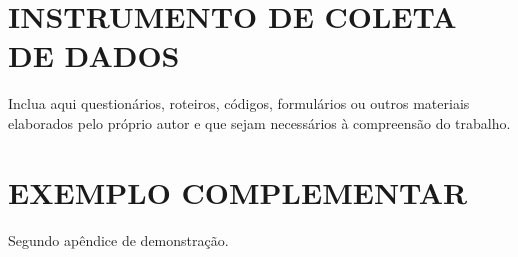 
\iniciarapendices

\chapter{INSTRUMENTO DE COLETA DE DADOS}

Inclua aqui questionários, roteiros, códigos, formulários ou outros materiais elaborados pelo próprio autor e que sejam necessários à compreensão do trabalho.

\chapter{EXEMPLO COMPLEMENTAR}

Segundo apêndice de demonstração.

\finalizarapendices
